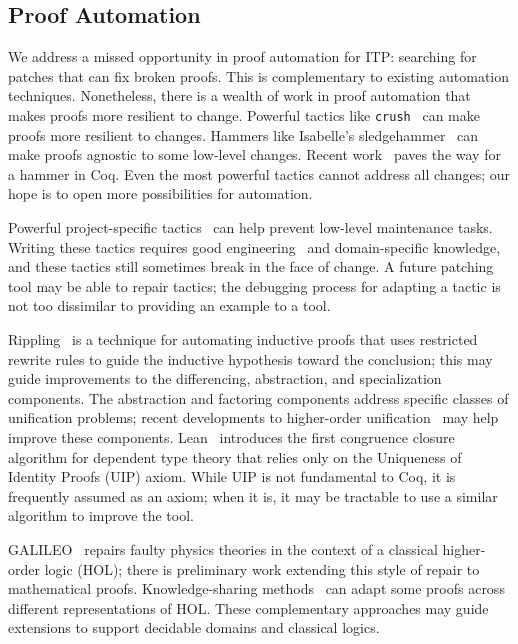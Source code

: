 \subsection*{Proof Automation}


We address a missed opportunity in proof automation for ITP: searching
for patches that can fix broken proofs.
This is complementary to existing automation techniques. Nonetheless, there is a wealth
of work in proof automation that makes proofs more resilient to change.
Powerful tactics like \lstinline{crush}~\cite{chlipala:cpdt} can make
proofs more resilient to changes. 
Hammers like Isabelle's sledgehammer~\cite{Blanchette2013} can make proofs agnostic to some low-level changes.
Recent work~\cite{coqhammer} paves the way for a hammer in Coq.
Even the most powerful tactics cannot address all changes;
our hope is to open more possibilities for automation.

Powerful project-specific tactics~\cite{chlipala:cpdt, Chlipala2013} can help prevent low-level maintenance tasks.
Writing these tactics requires good engineering~\cite{Gonthier2011} and domain-specific knowledge,
and these tactics still sometimes break in the face of change.
A future patching tool may be able to repair tactics; the debugging process
for adapting a tactic is not too dissimilar to providing an example to a tool.

Rippling~\cite{rippling} is a technique for automating inductive proofs that uses restricted rewrite rules to
guide the inductive hypothesis toward the conclusion; this may guide improvements to the
differencing, abstraction, and specialization components.
The abstraction and factoring components address specific classes of unification problems;
recent developments to higher-order unification~\cite{Miller:2012:PHL:2331097} may help
improve these components.
Lean~\cite{selsam:lean} introduces the first congruence closure algorithm for dependent type theory that
relies only on the Uniqueness of Identity Proofs (UIP) axiom. While UIP is not fundamental to Coq,
it is frequently assumed as an axiom; when it is, it may be tractable to use a similar algorithm to improve the tool.

GALILEO~\cite{bundyreasoning} repairs faulty physics theories
in the context of a classical higher-order logic (HOL); there is preliminary work extending this
style of repair to mathematical proofs. 
Knowledge-sharing methods~\cite{tgck-cicm14} can adapt some proofs across different representations of HOL.
These complementary approaches may guide extensions to support decidable domains and classical logics.
\fi


